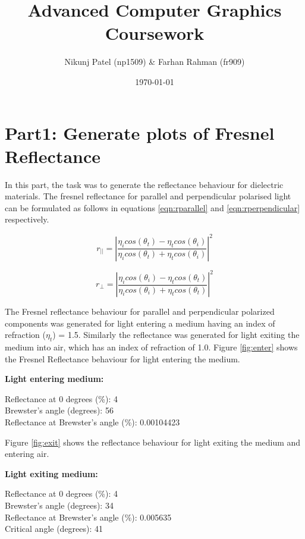 \documentclass[fleqn, hidelinks]{article} %
\author{Nikunj Patel (np1509) \& Farhan Rahman (fr909)}
\title{Advanced Computer Graphics Coursework}
\date{\today}
\begin{document}
\maketitle
\section{Part1: Generate plots of Fresnel Reflectance}

In this part, the task was to generate the reflectance behaviour for dielectric materials. The fresnel reflectance for parallel and perpendicular polarised light can be formulated as follows in equations \ref{eqn:rparallel} and \ref{eqn:rperpendicular} respectively.

\begin{equation}
	r_{||} = {\left|\frac{\eta_{i} cos(\theta_{t}) - \eta_{t} cos(\theta_{i})}{\eta_{i} cos(\theta_{t}) + \eta_{t} cos(\theta_{i})} \right|}^2
	\label{eqn:rparallel}
\end{equation}

\begin{equation}
	r_{\perp} = {\left|\frac{\eta_{i} cos(\theta_{i}) - \eta_{t} cos(\theta_{t})}{\eta_{i} cos(\theta_{i}) + \eta_{t} cos(\theta_{t})}\right|}^2
	\label{eqn:rperpendicular}
\end{equation}

The Fresnel reflectance behaviour for parallel and perpendicular polarized components was generated for light entering a medium having an index of refraction ($\eta_{t}$) = 1.5. Similarly the reflectance was generated for light exiting the medium into air, which has an index of refraction of 1.0. Figure \ref{fig:enter} shows the Fresnel Reflectance behaviour for light entering the medium. 

{\bf Light entering medium:}

Reflectance at 0 degrees (\%): 4 \\
Brewster's angle (degrees): 56 \\
Reflectance at Brewster's angle (\%): 0.00104423

Figure \ref{fig:exit} shows the reflectance behaviour for light exiting the medium and entering air.

{\bf Light exiting medium:}

Reflectance at 0 degrees (\%): 4 \\
Brewster's angle (degrees): 34 \\
Reflectance at Brewster's angle (\%): 0.005635 \\
Critical angle (degrees): 41
\end{document}
